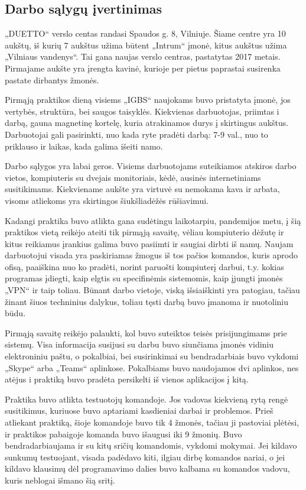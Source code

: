 \documentclass{VUMIFPSkursinis}
\begin{document}
\subsection{Darbo sąlygų įvertinimas}

„DUETTO“ verslo centas randasi Spaudos g. 8, Vilniuje. Šiame centre yra 10 aukštų, iš kurių 7 aukštus užima būtent „Intrum“ įmonė, kitus aukštus užima „Vilniaus vandenys“. Tai gana naujas verslo centras, pastatytas 2017 metais. Pirmajame aukšte yra įrengta kavinė, kurioje per pietus paprastai susirenka pastate dirbantys žmonės.

Pirmąją praktikos dieną visiems „IGBS“ naujokams buvo pristatyta įmonė, jos vertybės, struktūra, bei saugos taisyklės. Kiekvienas darbuotojas, priimtas i darbą, gauna magnetinę kortelę, kuria atrakinamos durys į skirtingus aukštus. Darbuotojai gali pasirinkti, nuo kada ryte pradėti darbą: 7-9 val., nuo to priklauso ir laikas, kada galima išeiti namo.

Darbo sąlygos yra labai geros. Visiems darbuotojams suteikiamos atskiros darbo vietos, kompiuteris su dvejais monitoriais, kėdė, ausinės internetiniams susitikimams. Kiekviename aukšte yra virtuvė su nemokama kava ir arbata, visoms atliekoms yra skirtingos šiukšliadėžės rūšiavimui. 

Kadangi praktika buvo atlikta gana sudėtingu laikotarpiu, pandemijos metu, į šią praktikos vietą reikėjo ateiti tik pirmąją savaitę, vėliau kompiuterio dėžutę ir kitus reikiamus įrankius galima buvo pasiimti ir saugiai dirbti iš namų. Naujam darbuotojui visada yra paskiriamas žmogus iš tos pačios komandos, kuris aprodo ofisą, paaiškina nuo ko pradėti, norint paruošti kompiuterį darbui, t.y. kokias programas įdiegti, kaip elgtis su specifinėmis sistemomis, kaip įjungti įmonės „VPN“ ir taip toliau. Būnant darbo vietoje, viską išsiaiškinti yra patogiau, tačiau žinant šiuos techninius dalykus, toliau tęsti darbą buvo įmanoma ir nuotoliniu būdu.

Pirmąją savaitę reikėjo palaukti, kol buvo suteiktos teisės prisijungimams prie sistemų. Visa informacija susijusi su darbu buvo siunčiama įmonės vidiniu elektroniniu paštu, o pokalbiai, bei susirinkimai su bendradarbiais buvo vykdomi „Skype“ arba „Teams“ aplinkose. Pokalbiams buvo naudojamos dvi aplinkos, nes atėjus i praktiką buvo pradėta persikelti iš vienos aplikacijos į kitą.

Praktika buvo atlikta testuotojų komandoje. Jos vadovas kiekvieną rytą rengė susitikimus, kuriuose buvo aptariami kasdieniai darbai ir problemos. Prieš atliekant praktiką, šioje komandoje buvo tik 4 žmonės, tačiau ji pastoviai plėtėsi, ir praktikos pabaigoje komanda buvo išaugusi iki 9 žmonių. Buvo bendradarbiaujama ir su kitų sričių komandomis, vykdomi mokymai. Jei kildavo sunkumų testuojant, visada padėdavo kiti, ilgiau dirbę komandos nariai, o jei kildavo klausimų dėl programavimo dalies buvo kalbama su komandos vadovu, kuris neblogai išmano šią sritį.
\end{document}
